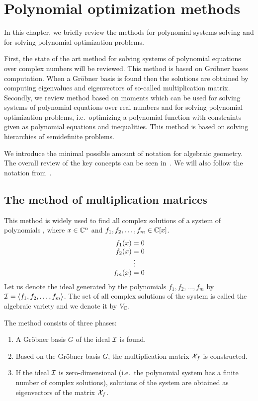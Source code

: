 \chapter{Polynomial optimization methods}
In this chapter, we briefly review the methods for polynomial systems solving and for solving polynomial optimization problems.

First, the state of the art method for solving systems of polynomial equations over complex numbers will be reviewed.
This method is based on Gr\"obner bases~\cite{Becker93} computation.
When a Gr\"obner basis is found then the solutions are obtained by computing eigenvalues and eigenvectors of so-called multiplication matrix.
Secondly, we review method based on moments which can be used for solving systems of polynomial equations over real numbers and for solving polynomial optimization problems, i.e.\ optimizing a polynomial function with constraints given as polynomial equations and inequalities.
This method is based on solving hierarchies of semidefinite problems.

We introduce the minimal possible amount of notation for algebraic geometry.
The overall review of the key concepts can be seen in~\cite{Cox-Little-Shea2015}.
We will also follow the notation from~\cite{Cox-Little-Shea2015}.

\section{The method of multiplication matrices}
This method is widely used to find all complex solutions of a system of polynomials , where $x\in\mathbb{C}^n$ and $f_1, f_2, \ldots, f_m\in\mathbb{C}[x]$.
\begin{align}
  \arraycolsep=1.4pt
  \begin{array}{rl}
    f_1(x) &= 0\\
    f_2(x) &= 0\\
    &\vdots\\
    f_m(x) &= 0
  \end{array}\labeleq{pol:mm:polynomialSystem}
\end{align}
Let us denote the ideal generated by the polynomials $f_1, f_2, \ldots, f_m$ by $\mathcal{I} = \langle f_1, f_2, \ldots, f_m\rangle$. The set of all complex solutions of the system  is called the algebraic variety and we denote it by $V_{\mathbb{C}}$.

The method consists of three phases:
\begin{enumerate}
  \item A Gr\"obner basis $G$ of the ideal $\mathcal{I}$ is found.
  \item Based on the Gr\"obner basis $G$, the multiplication matrix $\mathcal{X}_f$ is constructed.
  \item If the ideal $\mathcal{I}$ is zero-dimensional (i.e.\ the polynomial system has a finite number of complex solutions), solutions of the system  are obtained as eigenvectors of the matrix $\mathcal{X}_f$.
\end{enumerate}

